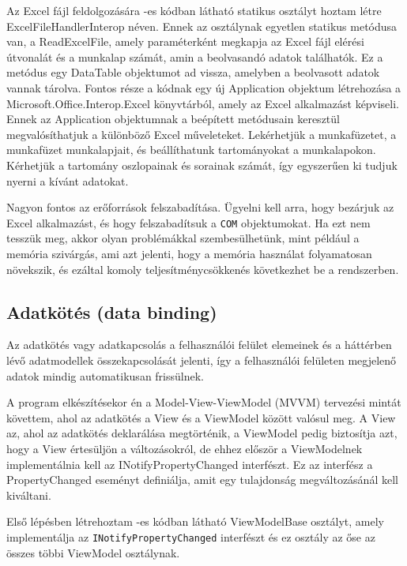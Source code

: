 \documentclass[
]{thesis-ekf}
\theoremstyle{definition}
\theoremstyle{remark}
\begin{document}
Az Excel fájl feldolgozására -es kódban látható statikus osztályt hoztam létre ExcelFileHandlerInterop néven. Ennek az osztálynak egyetlen statikus metódusa van, a ReadExcelFile, amely paraméterként megkapja az Excel fájl elérési útvonalát és a munkalap számát, amin a beolvasandó adatok találhatók. Ez a metódus egy DataTable objektumot ad vissza, amelyben a beolvasott adatok vannak tárolva. Fontos része a kódnak egy új Application objektum létrehozása a Microsoft.Office.Interop.Excel könyvtárból, amely az Excel alkalmazást képviseli. Ennek az Application objektumnak a beépített metódusain keresztül megvalósíthatjuk a különböző Excel műveleteket. Lekérhetjük a munkafüzetet, a munkafüzet munkalapjait, és beállíthatunk tartományokat a munkalapokon. Kérhetjük a tartomány oszlopainak és sorainak számát, így egyszerűen ki tudjuk nyerni a kívánt adatokat. 



Nagyon fontos az erőforrások felszabadítása. Ügyelni kell arra, hogy bezárjuk az Excel alkalmazást, és hogy felszabadítsuk a \texttt{COM} objektumokat. Ha ezt nem tesszük meg, akkor olyan problémákkal szembesülhetünk, mint például a memória szivárgás, ami azt jelenti, hogy a memória használat folyamatosan növekszik, és ezáltal komoly teljesítménycsökkenés következhet be a rendszerben.
\subsection{Adatkötés (data binding) \cite{Binding} \cite{WPF}}
Az adatkötés vagy adatkapcsolás a felhasználói felület elemeinek és a háttérben lévő adatmodellek összekapcsolását jelenti, így a felhasználói felületen megjelenő adatok mindig automatikusan frissülnek.

A program elkészítésekor én a Model-View-ViewModel (MVVM) tervezési mintát követtem, ahol az adatkötés a View és a ViewModel között valósul meg. A View az, ahol az adatkötés deklarálása megtörténik, a ViewModel pedig biztosítja azt, hogy a View értesüljön a változásokról, de ehhez először a ViewModelnek implementálnia kell az INotifyPropertyChanged interfészt. Ez az interfész a PropertyChanged eseményt definiálja, amit egy tulajdonság megváltozásánál kell kiváltani.

Első lépésben létrehoztam -es kódban látható ViewModelBase osztályt, amely implementálja az \texttt{INotifyPropertyChanged} interfészt és ez osztály az őse az összes többi ViewModel osztálynak.
\end{document}
